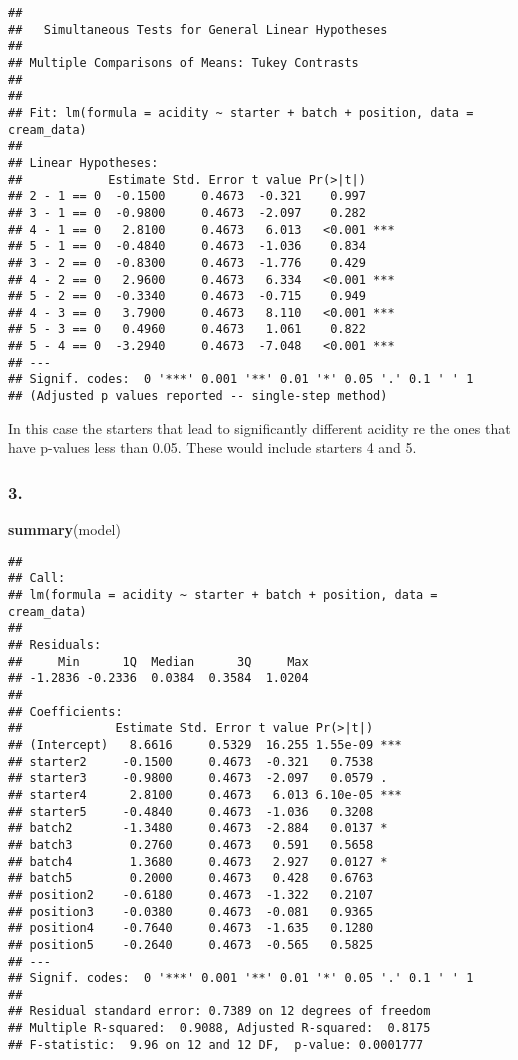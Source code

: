 \documentclass[11pt,]{article}
\newenvironment{Shaded}{\begin{snugshade}}{\end{snugshade}}
\newcommand{\KeywordTok}[1]{\textcolor[rgb]{0.13,0.29,0.53}{\textbf{{#1}}}}
\newcommand{\NormalTok}[1]{{#1}}
\begin{document}
\begin{verbatim}
## 
##   Simultaneous Tests for General Linear Hypotheses
## 
## Multiple Comparisons of Means: Tukey Contrasts
## 
## 
## Fit: lm(formula = acidity ~ starter + batch + position, data = cream_data)
## 
## Linear Hypotheses:
##            Estimate Std. Error t value Pr(>|t|)    
## 2 - 1 == 0  -0.1500     0.4673  -0.321    0.997    
## 3 - 1 == 0  -0.9800     0.4673  -2.097    0.282    
## 4 - 1 == 0   2.8100     0.4673   6.013   <0.001 ***
## 5 - 1 == 0  -0.4840     0.4673  -1.036    0.834    
## 3 - 2 == 0  -0.8300     0.4673  -1.776    0.429    
## 4 - 2 == 0   2.9600     0.4673   6.334   <0.001 ***
## 5 - 2 == 0  -0.3340     0.4673  -0.715    0.949    
## 4 - 3 == 0   3.7900     0.4673   8.110   <0.001 ***
## 5 - 3 == 0   0.4960     0.4673   1.061    0.822    
## 5 - 4 == 0  -3.2940     0.4673  -7.048   <0.001 ***
## ---
## Signif. codes:  0 '***' 0.001 '**' 0.01 '*' 0.05 '.' 0.1 ' ' 1
## (Adjusted p values reported -- single-step method)
\end{verbatim}

In this case the starters that lead to significantly different acidity
re the ones that have p-values less than 0.05. These would include
starters 4 and 5.

\subsubsection{3.}\label{section-14}

\begin{Shaded}
\begin{Highlighting}[]
\KeywordTok{summary}\NormalTok{(model)}
\end{Highlighting}
\end{Shaded}

\begin{verbatim}
## 
## Call:
## lm(formula = acidity ~ starter + batch + position, data = cream_data)
## 
## Residuals:
##     Min      1Q  Median      3Q     Max 
## -1.2836 -0.2336  0.0384  0.3584  1.0204 
## 
## Coefficients:
##             Estimate Std. Error t value Pr(>|t|)    
## (Intercept)   8.6616     0.5329  16.255 1.55e-09 ***
## starter2     -0.1500     0.4673  -0.321   0.7538    
## starter3     -0.9800     0.4673  -2.097   0.0579 .  
## starter4      2.8100     0.4673   6.013 6.10e-05 ***
## starter5     -0.4840     0.4673  -1.036   0.3208    
## batch2       -1.3480     0.4673  -2.884   0.0137 *  
## batch3        0.2760     0.4673   0.591   0.5658    
## batch4        1.3680     0.4673   2.927   0.0127 *  
## batch5        0.2000     0.4673   0.428   0.6763    
## position2    -0.6180     0.4673  -1.322   0.2107    
## position3    -0.0380     0.4673  -0.081   0.9365    
## position4    -0.7640     0.4673  -1.635   0.1280    
## position5    -0.2640     0.4673  -0.565   0.5825    
## ---
## Signif. codes:  0 '***' 0.001 '**' 0.01 '*' 0.05 '.' 0.1 ' ' 1
## 
## Residual standard error: 0.7389 on 12 degrees of freedom
## Multiple R-squared:  0.9088, Adjusted R-squared:  0.8175 
## F-statistic:  9.96 on 12 and 12 DF,  p-value: 0.0001777
\end{verbatim}
\end{document}
